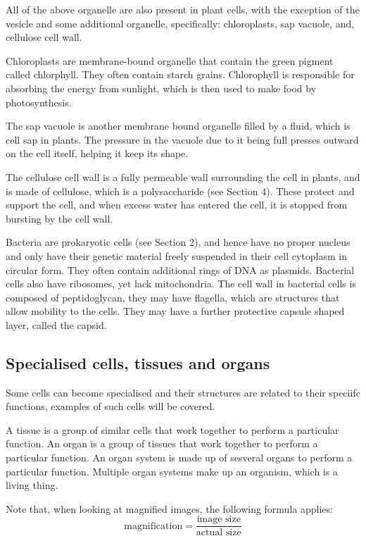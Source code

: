 All of the above organelle are also present in plant cells, with the exception of the vesicle and
some additional organelle, specifically: chloroplasts, sap vacuole, and, cellulose cell wall.

Chloroplasts are membrane-bound organelle that contain the green pigment called chlorphyll. They
often contain starch grains. Chlorophyll is responsible for absorbing the energy from sunlight, 
which is then used to make food by photosynthesis.

The sap vacuole is another membrane bound organelle filled by a fluid, which is cell sap in plants.
The pressure in the vacuole due to it being full presses outward on the cell itself, helping it
keep its shape.

The cellulose cell wall is a fully permeable wall surrounding the cell in plants, and is made of
cellulose, which is a polysaccharide (see Section 4). These protect and support the cell, and when
excess water has entered the cell, it is stopped from bursting by the cell wall.

Bacteria are prokaryotic cells (see Section 2), and hence have no proper nucleus and only have 
their genetic material freely suspended in their cell cytoplasm in circular form. They often 
contain additional rings of DNA as plasmids. Bacterial cells also have ribosomes, yet lack 
mitochondria. The cell wall in bacterial cells is composed of peptidoglycan, they may have flagella,
which are structures that allow mobility to the cells. They may have a further protective capsule
shaped layer, called the capsid.

\subsection{Specialised cells, tissues and organs}
Some cells can become specialised and their structures are related to their speciifc functions,
examples of such cells will be covered.

A tissue is a group of similar cells that work together to perform a particular function. An organ
is a group of tissues that work together to perform a particular function. An organ system is made
up of sesveral organs to perform a particular function. Multiple organ systems make up an organism,
which is a living thing.

Note that, when looking at magnified images, the following formula applies:
$$
\textrm{magnification} = \frac{\textrm{image size}}{\textrm{actual size}}
$$
